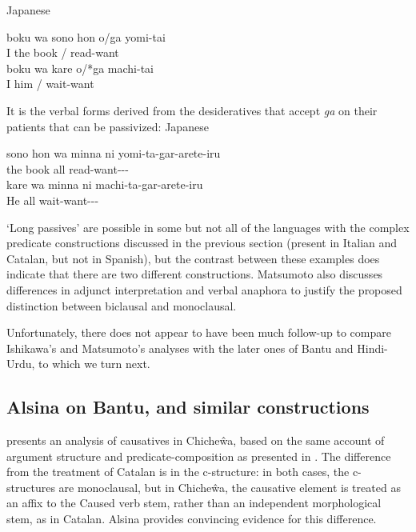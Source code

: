 \documentclass[output=paper,hidelinks]{langscibook}
\begin{document}
\ea Japanese \citep[107]{Matsumoto1996}\\
\begin{xlist}
\ex
\gll boku wa sono hon o/ga yomi-tai\\
I {\TOP} the book {\ACC/\NOM} read-want\\
\ex
\gll boku wa kare o/*ga machi-tai\\
I {\TOP} him {\ACC/\NOM} wait-want\\
\end{xlist}
\z
It is the verbal forms derived from the desideratives that accept \emph{ga}
on their patients that can be passivized:
\ea Japanese\\
\begin{xlist}
\ex
\gll sono hon wa minna ni yomi-ta-gar-arete-iru\\
the book {\TOP} all {\DAT} read-want-\VBLZ-\PASS-\ASP\\
\ex
\gll *kare wa minna ni machi-ta-gar-arete-iru\\
He {\TOP} all {\DAT} wait-want-\VBLZ-\PASS-\ASP\\
\end{xlist}
\z
`Long passives' are possible in some but not all of the languages with the
complex predicate constructions discussed in the previous section (present in
Italian and Catalan, but not in Spanish), but the contrast between these
examples does indicate that there are two different constructions.  Matsumoto
also discusses differences in adjunct interpretation and verbal anaphora to justify
the proposed distinction between biclausal and monoclausal.

Unfortunately, there does not appear to have been much follow-up to compare
Ishikawa's and Matsumoto's analyses with the later ones of Bantu and Hindi-Urdu, 
to which we turn next.

\subsection{Alsina on Bantu, and similar constructions}
\citet{Alsina1997} presents an analysis of causatives in Chiche\^wa, based on the
same account of argument structure and predicate-composition as presented in \citet{alsina1996the-role}.
The difference from the treatment of Catalan is in the c-structure: in both cases,
the c-structures are monoclausal, but in Chiche\^wa, the causative element is treated
as an affix to the Caused verb stem, rather than an independent morphological
stem, as in Catalan.  Alsina provides convincing evidence for this difference.
\end{document}
